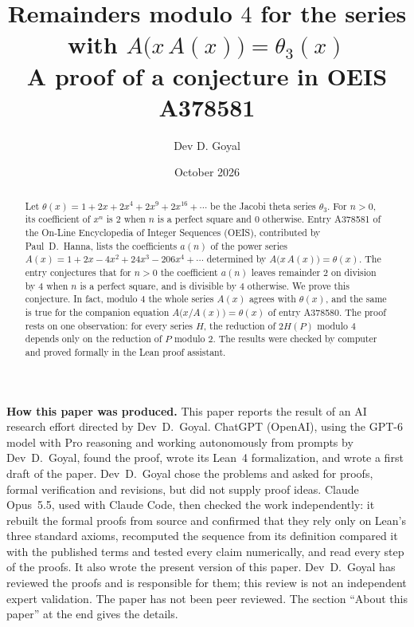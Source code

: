 \documentclass[11pt,a4paper]{article}
\title{Remainders modulo $4$ for the series with $A\bigl(x\,A(x)\bigr)=\theta_3(x)$\\[6pt]\large A proof of a conjecture in OEIS A378581}
\author{Dev D. Goyal}
\date{October 2026}
\theoremstyle{definition}
\theoremstyle{remark}
\begin{document}
\maketitle
\begin{abstract}
Let $\theta(x)=1+2x+2x^4+2x^9+2x^{16}+\cdots$ be the Jacobi theta series $\theta_3$. For $n>0$, its coefficient of $x^n$ is $2$ when $n$ is a
perfect square and $0$ otherwise. Entry A378581 of the On-Line Encyclopedia of Integer Sequences (OEIS),
contributed by Paul~D.~Hanna, lists the coefficients $a(n)$ of the power series $A(x)=1+2x-4x^2+24x^3-206x^4+\cdots$
determined by $A\bigl(x\,A(x)\bigr)=\theta(x)$. The entry conjectures that for $n>0$ the coefficient $a(n)$ leaves remainder $2$ on
division by $4$ when $n$ is a perfect square, and is divisible by $4$ otherwise. We prove this conjecture. In fact,
modulo $4$ the whole series $A(x)$ agrees with $\theta(x)$, and the same is true for the companion equation
$A\bigl(x/A(x)\bigr)=\theta(x)$ of entry A378580. The proof rests on one observation: for every series $H$, the
reduction of $2H(P)$ modulo $4$ depends only on the reduction of $P$ modulo $2$. The results were checked by computer and proved
formally in the Lean proof assistant.
\end{abstract}
\begin{center}\begin{minipage}{0.88\linewidth}\small
\textbf{How this paper was produced.} This paper reports the result of an AI research effort directed by
Dev~D.~Goyal. ChatGPT (OpenAI), using the GPT-6 model with Pro reasoning and working autonomously from prompts by
Dev~D.~Goyal, found the proof, wrote its Lean~4 formalization, and wrote a first draft of the paper.
Dev~D.~Goyal chose the problems and asked for proofs, formal verification and revisions, but did not supply proof
ideas. Claude Opus~5.5, used with Claude Code, then checked the work independently: it rebuilt the formal proofs from
source and confirmed that they rely only on Lean's three standard axioms, recomputed the sequence from its definition
compared it with the published terms and tested every claim numerically, and read every step of the proofs. It also wrote the present
version of this paper.
Dev~D.~Goyal has reviewed the proofs and is responsible for them; this review is not an independent expert validation.
The paper has not been peer reviewed.
The section ``About this paper'' at the end gives the details.
\end{minipage}\end{center}
\end{document}
